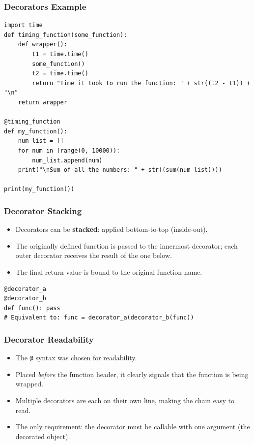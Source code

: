 \begin{frame}[fragile]\frametitle{Decorators Example}
        \begin{lstlisting}
import time
def timing_function(some_function):
    def wrapper():
        t1 = time.time()
        some_function()
        t2 = time.time()
        return "Time it took to run the function: " + str((t2 - t1)) + "\n"
    return wrapper

@timing_function
def my_function():
    num_list = []
    for num in (range(0, 10000)):
        num_list.append(num)
    print("\nSum of all the numbers: " + str((sum(num_list))))

print(my_function())
\end{lstlisting}
\end{frame}



\begin{frame}[fragile]\frametitle{Decorator Stacking}
    \begin{itemize}
    \item Decorators can be \textbf{stacked}: applied bottom-to-top (inside-out).
    \item The originally defined function is passed to the innermost decorator; each outer decorator receives the result of the one below.
    \item The final return value is bound to the original function name.
    \end{itemize}
\begin{lstlisting}
@decorator_a
@decorator_b
def func(): pass
# Equivalent to: func = decorator_a(decorator_b(func))
\end{lstlisting}
\end{frame}

\begin{frame}[fragile]\frametitle{Decorator Readability}
    \begin{itemize}
    \item The \texttt{@} syntax was chosen for readability.
    \item Placed \emph{before} the function header, it clearly signals that the function is being wrapped.
    \item Multiple decorators are each on their own line, making the chain easy to read.
    \item The only requirement: the decorator must be callable with one argument (the decorated object).
    \end{itemize}
\end{frame}

